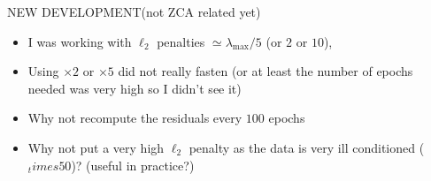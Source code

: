\documentclass[10pt,aspectratio=43]{beamer}
\begin{document}
\begin{frame}{NEW DEVELOPMENT}{(not ZCA related yet)}

    \begin{itemize}
        \item I was working with $\ell_2$ penalties $\simeq \lambda_{\max} / 5$ (or $2$ or $10$),
        \item Using $\times 2$ or $\times 5$ did not really fasten (or at least the number of epochs needed was very high so I didn't see it)
        \item Why not recompute the residuals every $100$ epochs
        \item Why not put a very high $\ell_2$ penalty as the data is very ill conditioned ($_times 50$)? (useful in practice?)
    \end{itemize}


\end{frame}
\end{document}
